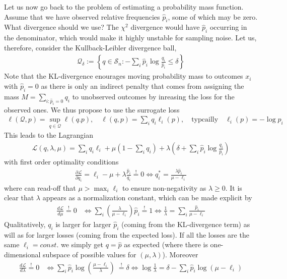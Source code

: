 \documentclass{article}
\begin{document}
Let us now go back to the problem of estimating a probability mass function. Assume that we have observed relative frequencies $\hat p_i$, some of which may be zero. What divergence should we use? The $\chi^2$ divergence would have $\hat p_i$ occurring in the denominator, which would make it highly unstable for sampling noise. Let us, therefore, consider the Kullback-Leibler divergence ball,
\begin{align}
\mathcal Q_\delta := \left\{ q \in \mathcal S_n: -\sum_i \hat p_i \log \frac{q_i}{\hat p_i} \le \delta \right\}
\end{align}
Note that the KL-divergence enourages moving probability mass to outcomes $x_i$ with $\hat p_i =0$ as there is only an indirect penalty that comes from assigning the mass $M = \sum_{i: \hat p_i=0} q_i$ to unobserved outcomes by inreasing the loss for the observed ones.  We thus propose to use the surrogate loss
\begin{align}
\ell (\mathcal Q,p) = \sup_{q \in \mathcal Q} \ell(q.p), \quad \ell(q,p) = \sum_i q_i \ell_i(p), \quad \text{typcailly} \quad \ell_i(p) = -\log p_i
\end{align}
This leads to the Lagrangian 
\begin{align}
\mathcal L(q, \lambda, \mu) = \sum_i q_i \ell_i + \mu \left( 1- \sum_i q_i \right) + \lambda \left( \delta + \sum_i \hat p_i \log \frac{q_i}{\hat p_i} \right)
\end{align}
with first order optimality conditions 
\begin{align}
\frac{\partial \mathcal L}{\partial q_i}  = \ell_i - \mu + \lambda \frac{\hat p_i}{q_i} \stackrel !=0
\iff q_i^* = \frac{\lambda \hat p_i}{\mu - \ell_i}  
\end{align}
where can read-off that $\mu > \max_{i} \ell_i$ to ensure non-negativity as $\lambda \ge 0$. 
It is clear that $\lambda$ appears as a normalization constant, which can be made explicit by 
\begin{align}
 \frac{d \mathcal L}{d \mu} \stackrel !=0  & \iff \sum_{i} \left( \frac{\lambda }{\mu - \ell_i} \right) \hat p_i \stackrel != 1 
\iff \frac{1}{\lambda} = \sum_i \frac{\hat p_i}{\mu - \ell_i}
\end{align}
Qualitatively, $q_i$ is larger for larger $\hat p_i$ (coming from the KL-divergence term) as will as for larger losses (coming from the expected loss). If all the losses are the same $\ell_i = const.$ we simply get $q = \hat p$ as expected (where there is one-dimensional subspace of possible values for $(\mu,\lambda)$). Moreover
\begin{align}
\frac{d \mathcal L}{d \lambda} \stackrel !=0 & \iff \sum_{i} \hat p_i \log \left( \frac{\mu - \ell_i}{\lambda}\right) \ \stackrel != \delta
\iff \log \frac{1}{\lambda}= \delta - \sum_i \hat p_i \log (\mu - \ell_i )
\end{align}
\end{document}

